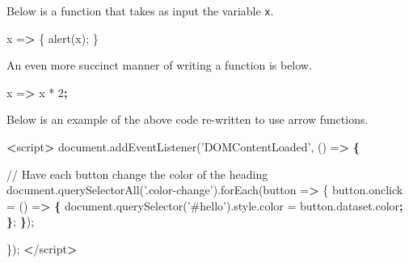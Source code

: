 \documentclass[]{book}
\newenvironment{Shaded}{\begin{snugshade}}{\end{snugshade}}
\newcommand{\KeywordTok}[1]{\textcolor[rgb]{0.13,0.29,0.53}{\textbf{#1}}}
\newcommand{\StringTok}[1]{\textcolor[rgb]{0.31,0.60,0.02}{#1}}
\newcommand{\OperatorTok}[1]{\textcolor[rgb]{0.81,0.36,0.00}{\textbf{#1}}}
\newcommand{\ExtensionTok}[1]{#1}
\newcommand{\NormalTok}[1]{#1}
\begin{document}
Below is a function that takes as input the variable \texttt{x}.

\begin{Shaded}
\begin{Highlighting}[]
\ExtensionTok{x}\NormalTok{ =}\OperatorTok{>}\NormalTok{ \{}
    \ExtensionTok{alert}\NormalTok{(x);}
\NormalTok{\}}
\end{Highlighting}
\end{Shaded}

An even more succinct manner of writing a function is below.

\begin{Shaded}
\begin{Highlighting}[]
\ExtensionTok{x}\NormalTok{ =}\OperatorTok{>}\NormalTok{ x * 2}\KeywordTok{;}
\end{Highlighting}
\end{Shaded}

Below is an example of the above code re-written to use arrow functions.

\begin{Shaded}
\begin{Highlighting}[]
\OperatorTok{<}\ExtensionTok{script}\OperatorTok{>}                                                                            
    \ExtensionTok{document.addEventListener}\NormalTok{(}\StringTok{'DOMContentLoaded'}\NormalTok{, () =}\OperatorTok{>} \KeywordTok{\{}                           
                                                                                    
        \ExtensionTok{//}\NormalTok{ Have each button change the color of the heading                         }
        \ExtensionTok{document.querySelectorAll}\NormalTok{(}\StringTok{'.color-change'}\NormalTok{)}\ExtensionTok{.forEach}\NormalTok{(button =}\OperatorTok{>}\NormalTok{ \{              }
            \ExtensionTok{button.onclick}\NormalTok{ = () =}\OperatorTok{>} \KeywordTok{\{}                                                
                \ExtensionTok{document.querySelector}\NormalTok{(}\StringTok{'#hello'}\NormalTok{)}\ExtensionTok{.style.color}\NormalTok{ = button.dataset.color}\KeywordTok{;}
            \KeywordTok{\}}\NormalTok{;                                                                      }
        \KeywordTok{\}}\NormalTok{);                                                                         }
                                                                                    
\NormalTok{    \});                                                                             }
\OperatorTok{<}\NormalTok{/}\ExtensionTok{script}\OperatorTok{>}                                                                           
\end{Highlighting}
\end{Shaded}
\end{document}
